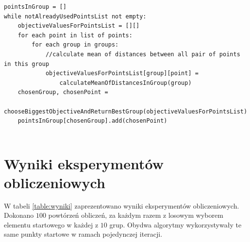\documentclass{mwart}
\begin{document}
\begin{lstlisting}[style=JavaStyle]
pointsInGroup = []
while notAlreadyUsedPointsList not empty:
    objectiveValuesForPointsList = [][]
    for each point in list of points:
        for each group in groups:
            //calculate mean of distances between all pair of points in this group
            objectiveValuesForPointsList[group][point] =
                calculateMeanOfDistancesInGroup(group)
    chosenGroup, chosenPoint =
        chooseBiggestObjectiveAndReturnBestGroup(objectiveValuesForPointsList)
    pointsInGroup[chosenGroup].add(chosenPoint)
        
\end{lstlisting}

\section{Wyniki eksperymentów obliczeniowych}
W tabeli \ref{table:wyniki} zaprezentowano wyniki eksperymentów obliczeniowych. Dokonano $100$ powtórzeń obliczeń, za każdym razem z losowym wyborem elementu startowego w każdej z $10$ grup. Obydwa algorytmy wykorzystywały te same punkty startowe w ramach pojedynczej iteracji.
\end{document}
